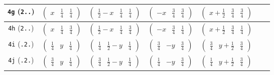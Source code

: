 \documentclass[fleqn,9pt,landscape]{jsarticle}
\begin{document}
\begin{center}
\begin{longtable}{ccccccc}
{\tt 4g} ({\tt 2..}) & $ \begin{pmatrix} x & \frac{1}{4} & \frac{1}{4} \end{pmatrix} $ & $ \begin{pmatrix} \frac{1}{2} - x & \frac{1}{4} & \frac{1}{4} \end{pmatrix} $ & $ \begin{pmatrix} - x & \frac{3}{4} & \frac{3}{4} \end{pmatrix} $ & $ \begin{pmatrix} x + \frac{1}{2} & \frac{3}{4} & \frac{3}{4} \end{pmatrix} $ & $  $ & $  $ \\ \hline
{\tt 4h} ({\tt 2..}) & $ \begin{pmatrix} x & \frac{1}{4} & \frac{3}{4} \end{pmatrix} $ & $ \begin{pmatrix} \frac{1}{2} - x & \frac{1}{4} & \frac{3}{4} \end{pmatrix} $ & $ \begin{pmatrix} - x & \frac{3}{4} & \frac{1}{4} \end{pmatrix} $ & $ \begin{pmatrix} x + \frac{1}{2} & \frac{3}{4} & \frac{1}{4} \end{pmatrix} $ & $  $ & $  $ \\ \hline
{\tt 4i} ({\tt .2.}) & $ \begin{pmatrix} \frac{1}{4} & y & \frac{1}{4} \end{pmatrix} $ & $ \begin{pmatrix} \frac{1}{4} & \frac{1}{2} - y & \frac{1}{4} \end{pmatrix} $ & $ \begin{pmatrix} \frac{3}{4} & - y & \frac{3}{4} \end{pmatrix} $ & $ \begin{pmatrix} \frac{3}{4} & y + \frac{1}{2} & \frac{3}{4} \end{pmatrix} $ & $  $ & $  $ \\ \hline
{\tt 4j} ({\tt .2.}) & $ \begin{pmatrix} \frac{3}{4} & y & \frac{1}{4} \end{pmatrix} $ & $ \begin{pmatrix} \frac{3}{4} & \frac{1}{2} - y & \frac{1}{4} \end{pmatrix} $ & $ \begin{pmatrix} \frac{1}{4} & - y & \frac{3}{4} \end{pmatrix} $ & $ \begin{pmatrix} \frac{1}{4} & y + \frac{1}{2} & \frac{3}{4} \end{pmatrix} $ & $  $ & $  $ \\ \hline

\end{longtable}
\end{center}
\end{document}
